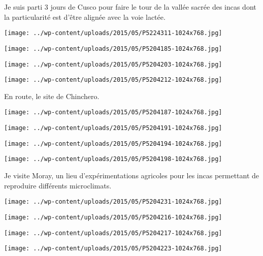Je suis parti 3 jours de Cusco pour faire le tour de la vallée sacrée des incas dont la particularité est d'être alignée avec la voie lactée. 
\begin{center} \texttt{[image: ../wp-content/uploads/2015/05/P5224311-1024x768.jpg]} \end{center}
\begin{center} \texttt{[image: ../wp-content/uploads/2015/05/P5204185-1024x768.jpg]} \end{center}
\begin{center} \texttt{[image: ../wp-content/uploads/2015/05/P5204203-1024x768.jpg]} \end{center}
\begin{center} \texttt{[image: ../wp-content/uploads/2015/05/P5204212-1024x768.jpg]} \end{center}

En route, le site de Chinchero. 
\begin{center} \texttt{[image: ../wp-content/uploads/2015/05/P5204187-1024x768.jpg]} \end{center}
\begin{center} \texttt{[image: ../wp-content/uploads/2015/05/P5204191-1024x768.jpg]} \end{center}
\begin{center} \texttt{[image: ../wp-content/uploads/2015/05/P5204194-1024x768.jpg]} \end{center}
\begin{center} \texttt{[image: ../wp-content/uploads/2015/05/P5204198-1024x768.jpg]} \end{center}

Je visite Moray, un lieu d'expérimentations agricoles pour les incas permettant de reproduire différents microclimats. 
\begin{center} \texttt{[image: ../wp-content/uploads/2015/05/P5204231-1024x768.jpg]} \end{center}
\begin{center} \texttt{[image: ../wp-content/uploads/2015/05/P5204216-1024x768.jpg]} \end{center}
\begin{center} \texttt{[image: ../wp-content/uploads/2015/05/P5204217-1024x768.jpg]} \end{center}
\begin{center} \texttt{[image: ../wp-content/uploads/2015/05/P5204223-1024x768.jpg]} \end{center}

